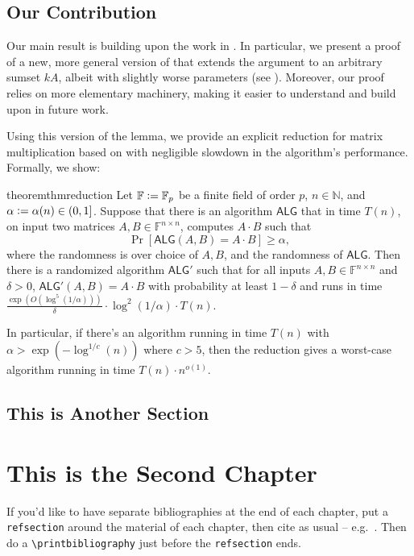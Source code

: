 \documentclass[12pt]{caltech_thesis}
\newcommand{\defeq}{\vcentcolon=}
\def\F{\mathbb{F}}
\begin{document}
\section{Our Contribution}

Our main result is building upon the work in \cite{asadi2022worstcase}. In particular, we present a proof of a new, more general version of  that extends the argument to an arbitrary sumset $kA$, albeit with slightly worse parameters (see ). Moreover, our proof relies on more elementary machinery, making it easier to understand and build upon in future work.

Using this version of the lemma, we provide an explicit reduction for matrix multiplication based on  with negligible slowdown in the algorithm's performance. Formally, we show:
\begin{restatable}{theorem}{thmreduction}
\label{thm:reduction}
    Let $\F \defeq \F_p$ be a finite field of order $p$, $n \in \mathbb{N}$, and $\alpha \defeq \alpha(n) \in (0, 1]$.
    Suppose that there is an algorithm $\mathsf{ALG}$ that in time $T(n)$, on input two matrices $A, B \in \F^{n\times n}$, computes $A\cdot B$ such that
    \begin{equation*}
        \Pr[\mathsf{ALG}(A, B) = A\cdot B] \geq \alpha,
    \end{equation*}
    where the randomness is over choice of $A, B$, and the randomness of $\mathsf{ALG}$.
    Then there is a randomized algorithm $\mathsf{ALG}'$ such that for all inputs $A, B \in \F^{n \times n}$ and $\delta > 0$, $\mathsf{ALG}'(A, B) = A \cdot B$ with probability at least $1 - \delta$ and runs in time $\frac{\exp(O(\log^5 (1/\alpha)))}{\delta}\cdot\log^2(1/\alpha)\cdot T(n)$.
\end{restatable}
\noindent In particular, if there's an algorithm running in time $T(n)$ with $\alpha > \exp(-\log^{1/c}(n))$ where $c > 5$, then the reduction gives a worst-case algorithm running in time $T(n)\cdot n^{o(1)}$.


\section{This is Another Section}
\lipsum[6-7] 

\chapter{This is the Second Chapter}
\begin{refsection}
If you'd like to have separate bibliographies at the end of each chapter, put a \verb|refsection| around the material of each chapter, then cite as usual -- e.g.~\citep{GMP81,Ful83}. Then do a \verb|\printbibliography| just before the \verb|refsection| ends. 

\printbibliography[heading=subbibliography]
\end{refsection}
\end{document}
